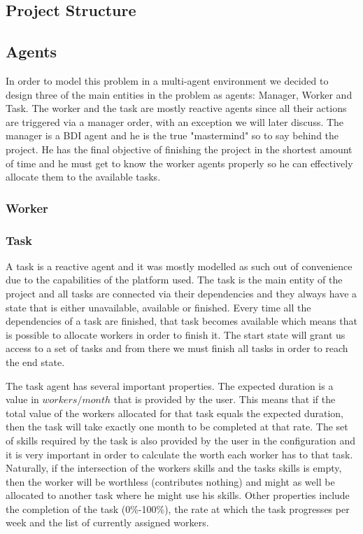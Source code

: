 \documentclass[paper=a4, fontsize=11pt]{scrartcl} %
\numberwithin{equation}{section} %
\numberwithin{figure}{section} %
\numberwithin{table}{section} %
\begin{document}
\subsection{Project Structure}

\subsection{Agents}
In order to model this problem in a multi-agent environment we decided to design three of the main entities in the problem as agents: Manager, Worker and Task. The worker and the task are mostly reactive agents since all their actions are triggered via a manager order, with an exception we will later discuss. The manager is a BDI agent and he is the true "mastermind" so to say behind the project. He has the final objective of finishing the project in the shortest amount of time and he must get to know the worker agents properly so he can effectively allocate them to the available tasks.

\subsubsection{Worker}

\subsubsection{Task}
A task is a reactive agent and it was mostly modelled as such out of convenience due to the capabilities of the platform used. The task is the main entity of the project and all tasks are connected via their dependencies and they always have a state that is either unavailable, available or finished. Every time all the dependencies of a task are finished, that task becomes available which means that is possible to allocate workers in order to finish it. The start state will grant us access to a set of tasks and from there we must finish all tasks in order to reach the end state.

The task agent has several important properties. The expected duration is a value in $workers/month$ that is provided by the user. This means that if the total value of the workers allocated for that task equals the expected duration, then the task will take exactly one month to be completed at that rate.
The set of skills required by the task is also provided by the user in the configuration and it is very important in order to calculate the worth each worker has to that task. Naturally, if the intersection of the workers skills and the tasks skills is empty, then the worker will be worthless (contributes nothing) and might as well be allocated to another task where he might use his skills. Other properties include the completion of the task (0\%-100\%), the rate at which the task progresses per week and the list of currently assigned workers.
\end{document}
